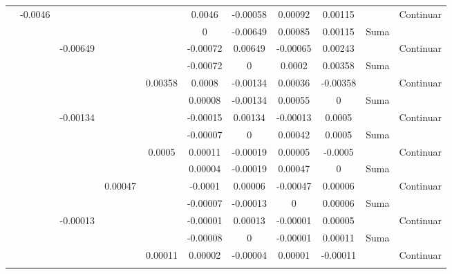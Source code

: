 \documentclass{article}
\begin{document}
\begin{figure}[H]
\begin{adjustwidth}{-4cm}{0cm}
{\begin{tabular}{|c|c|c|c|c|c|c|c|c|c|c|}
               &   -0.0046 &       &       &       &   0.0046  &   -0.00058    &   0.00092 &   0.00115 &       &   Continuar   \\ \rowcolor{lightgray}
               &       &       &       &       &   0   &   -0.00649    &   0.00085 &   0.00115 &   Suma    &       \\ \hline
               &       &   -0.00649    &       &       &   -0.00072    &   0.00649 &   -0.00065    &   0.00243 &       &   Continuar   \\ \rowcolor{lightgray}
               &       &       &       &       &   -0.00072    &   0   &   0.0002  &   0.00358 &   Suma    &       \\ \hline
               &       &       &       &   0.00358 &   0.0008  &   -0.00134    &   0.00036 &   -0.00358    &       &   Continuar   \\ \rowcolor{lightgray}
               &       &       &       &       &   0.00008 &   -0.00134    &   0.00055 &   0   &   Suma    &       \\ \hline
               &       &   -0.00134    &       &       &   -0.00015    &   0.00134 &   -0.00013    &   0.0005  &       &   Continuar   \\ \rowcolor{lightgray}
               &       &       &       &       &   -0.00007    &   0   &   0.00042 &   0.0005  &   Suma    &       \\ \hline
               &       &       &       &   0.0005  &   0.00011 &   -0.00019    &   0.00005 &   -0.0005 &       &   Continuar   \\ \rowcolor{lightgray}
               &       &       &       &       &   0.00004 &   -0.00019    &   0.00047 &   0   &   Suma    &       \\ \hline
               &       &       &   0.00047 &       &   -0.0001 &   0.00006 &   -0.00047    &   0.00006 &       &   Continuar   \\ \rowcolor{lightgray}
               &       &       &       &       &   -0.00007    &   -0.00013    &   0   &   0.00006 &   Suma    &       \\ \hline
               &       &   -0.00013    &       &       &   -0.00001    &   0.00013 &   -0.00001    &   0.00005 &       &   Continuar   \\ \rowcolor{lightgray}
               &       &       &       &       &   -0.00008    &   0   &   -0.00001    &   0.00011 &   Suma    &       \\ \hline
               &       &       &       &   0.00011 &   0.00002 &   -0.00004    &   0.00001 &   -0.00011    &       &   Continuar   \\ \rowcolor{lightgray}

\end{tabular}}
\end{adjustwidth}
\end{figure}
\end{document}
